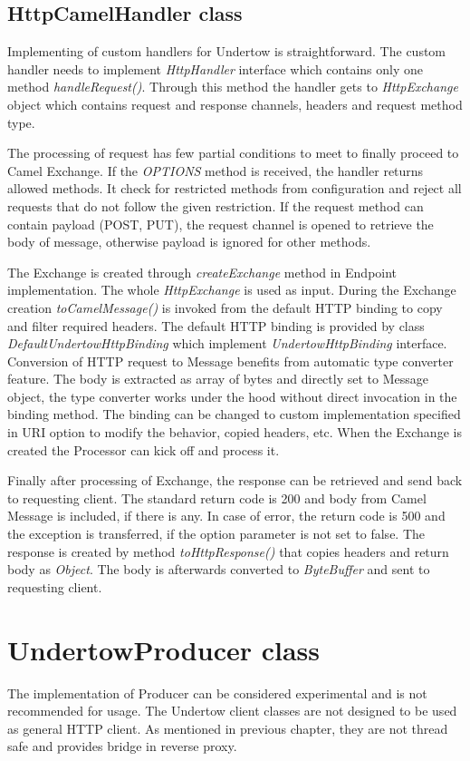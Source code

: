 \documentclass[12pt,final,oneside]{fithesis2}
\begin{document}
\subsection{HttpCamelHandler class}
Implementing of custom handlers for Undertow is straightforward. The custom handler needs to implement \textit{HttpHandler} interface which contains only one method \textit{handleRequest()}. Through this method the handler gets to \textit{HttpExchange} object which contains request and response channels, headers and request method type. 

The processing of request has few partial conditions to meet to finally proceed to Camel Exchange. If the \textit{OPTIONS} method is received, the handler returns allowed methods. It check for restricted methods from configuration and reject all requests that do not follow the given restriction. If the request method can contain payload (POST, PUT), the request channel is opened to retrieve the body of message, otherwise payload is ignored for other methods.

The Exchange is created through \textit{createExchange} method in Endpoint implementation. The whole \textit{HttpExchange} is used as input. During the Exchange creation \textit{toCamelMessage()} is invoked from the default HTTP binding to copy and filter required headers. The default HTTP binding is provided by class \textit{DefaultUndertowHttpBinding} which implement \textit{UndertowHttpBinding} interface. Conversion of HTTP request to Message benefits from automatic type converter feature. The body is extracted as array of bytes and directly set to Message object, the type converter works under the hood without direct invocation in the binding method. The binding can be changed to custom implementation specified in URI option to modify the behavior, copied headers, etc. When the Exchange is created the Processor can kick off and process it.

 Finally after processing of Exchange, the response can be retrieved and send back to requesting client. The standard return code is 200 and body from Camel Message is included, if there is any. In case of error, the return code is 500 and the exception is transferred, if the option parameter is not set to false. The response is created by method \textit{toHttpResponse()} that copies headers and return body as \textit{Object}. The body is afterwards converted to \textit{ByteBuffer} and sent to requesting client.

\section{UndertowProducer class}
The implementation of Producer can be considered experimental and is not recommended for usage. The Undertow client classes are not designed to be used as general HTTP client. As mentioned in previous chapter, they are not thread safe and provides bridge in reverse proxy.
\end{document}
